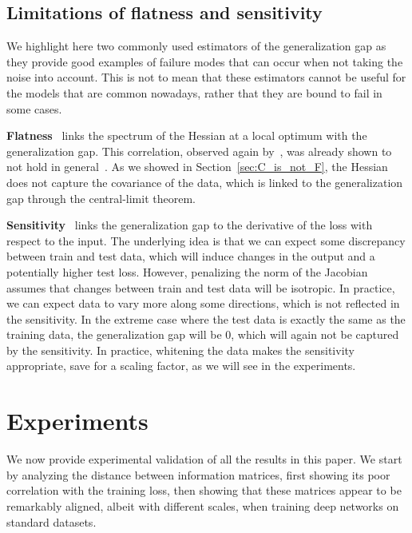 \subsection{Limitations of flatness and sensitivity}
We highlight here two commonly used estimators of the generalization gap as they provide good examples of failure modes that can occur when not taking the noise into account. This is not to mean that these estimators cannot be useful for the models that are common nowadays, rather that they are bound to fail in some cases.

\textbf{Flatness}~\citep{hochreiter1997flat} links the spectrum of the Hessian at a local optimum with the generalization gap. This correlation, observed again by~\citet{keskar2016large}, was already shown to not hold in general~\citep{dinh2017sharp}. As we showed in Section~\ref{sec:C_is_not_F}, the Hessian does not capture the covariance of the data, which is linked to the generalization gap through the central-limit theorem.

\textbf{Sensitivity}~\citep{novak2018sensitivity} links the generalization gap to the derivative of the loss with respect to the input. The underlying idea is that we can expect some discrepancy between train and test data, which will induce changes in the output and a potentially higher test loss. However, penalizing the norm of the Jacobian assumes that changes between train and test data will be isotropic. In practice, we can expect data to vary more along some directions, which is not reflected in the sensitivity. In the extreme case where the test data is exactly the same as the training data, the generalization gap will be 0, which will again not be captured by the sensitivity. In practice, whitening the data makes the sensitivity appropriate, save for a scaling factor, as we will see in the experiments.















\section{Experiments}
We now provide experimental validation of all the results in this paper. We start by analyzing the distance between information matrices, first showing its poor correlation with the training loss, then showing that these matrices appear to be remarkably aligned, albeit with different scales, when training deep networks on standard datasets.

